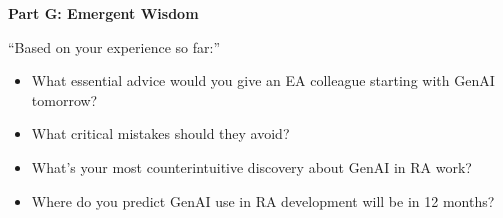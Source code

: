 \textbf{Part G: Emergent Wisdom}

``Based on your experience so far:''
\begin{itemize}
    \item What essential advice would you give an EA colleague starting with GenAI
          tomorrow?
    \item What critical mistakes should they avoid?
    \item What's your most counterintuitive discovery about GenAI in RA work?
    \item Where do you predict GenAI use in RA development will be in 12 months?
\end{itemize}

